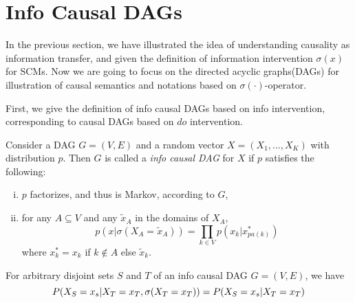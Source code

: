 






\section{Info Causal DAGs}

In the previous section, we have illustrated the idea of understanding causality as information transfer, and given the definition of information intervention $\sigma(x)$ for SCMs. Now we are going to focus on the directed acyclic graphs(DAGs) for illustration of causal semantics and notations based on $\sigma(\cdot)$-operator.

First, we give the definition of info causal DAGs based on info intervention, corresponding to causal DAGs based on $do$ intervention.

\begin{Def}
	Consider a DAG $G = (V, E)$ and a random vector $X = (X_1, ..., X_K)$ with distribution $p$. Then $G$ is called a \emph{info causal DAG} for $X$ if $p$ satisfies the following:
	\begin{enumerate}[(i)]
		\setlength{\itemsep}{0pt}
		\item $p$ factorizes, and thus is Markov, according to $G$,  
		\item for any $A \subseteq V$ and any $\tilde{x}_A$ in the domains of $X_A$,
		\begin{equation}\label{eq:sigma}
			p(x| \sigma(X_A =\tilde{x}_A)) = \prod_{k \in V} p(x_k|x_{pa(k)}^*)
		\end{equation}		
		where $x^*_k = x_k$ if $k \notin A$ else $\tilde{x}_k$.
	\end{enumerate}
\end{Def}



\begin{Lem}
	\label{Lem:consistent}
	For arbitrary disjoint sets  $S$ and $T$ of an info causal DAG $G = (V, E)$,  we have 
	$$
	P(X_S=x_s|X_T=x_T, \mathrm{\sigma}(X_T=x_T)) = P(X_S=x_s|X_T=x_T)
	$$
\end{Lem}

